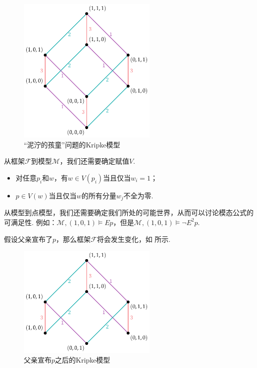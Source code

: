 \begin{figure}[ht]
    \centering
    \includegraphics[width=0.6\textwidth]{figures/modal-logic/cubic-example.pdf}
    \caption{“泥泞的孩童”问题的Kripke模型}\label{fig:modal-logic-cubic}
\end{figure}

从框架$\mathcal{F}$到模型$\mathcal{M}$，我们还需要确定赋值$V$. 
\begin{itemize}
    \item 对任意$p_i$和$w$，有$w\in V(p_i)$当且仅当$w_i=1$；
    \item $p\in V(w)$当且仅当$w$的所有分量$w_j$不全为零. 
\end{itemize}

从模型到点模型，我们还需要确定我们所处的可能世界，从而可以讨论模态公式的可满足性. 例如：$\mathcal{M},(1,0,1)\vDash Ep$，但是$\mathcal{M},(1,0,1)\vDash \neg E^2p$. 

假设父亲宣布了$p$，那么框架$\mathcal{F}$将会发生变化，如 所示. 

\begin{figure}[h]
    \centering
    \includegraphics[width=0.6\textwidth]{figures/modal-logic/cubic-example-after-father.pdf}
    \caption{父亲宣布$p$之后的Kripke模型}\label{fig:modal-logic-cubic-after-father}
\end{figure}

